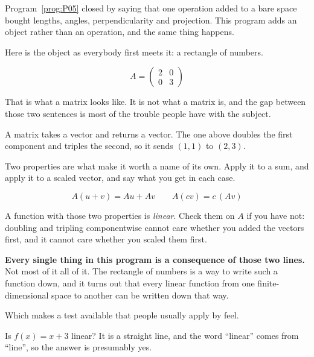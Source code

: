 \begin{fr}
Program~\ref{prog:P05} closed by saying that one operation added to a bare
space bought lengths, angles, perpendicularity and projection. This program
adds an object rather than an operation, and the same thing happens.

Here is the object as everybody first meets it: a rectangle of numbers.

\[ A = \begin{pmatrix} 2 & 0 \\ 0 & 3 \end{pmatrix} \]

That is what a matrix looks like. It is not what a matrix is, and the gap
between those two sentences is most of the trouble people have with the
subject.
\end{fr}

\begin{fr}
A matrix takes a vector and returns a vector. The one above doubles the first
component and triples the second, so it sends $(1, 1)$ to $(2, 3)$.

Two properties are what make it worth a name of its own. Apply it to a sum, and
apply it to a scaled vector, and say what you get in each case.
\dotline
\nextframe
\end{fr}

\begin{fr}
\begin{ansblock}
\[ A(u + v) = Au + Av \qquad A(cv) = c\,(Av) \]
\end{ansblock}

A function with those two properties is \emph{linear}. Check them on $A$ if you
have not: doubling and tripling componentwise cannot care whether you added the
vectors first, and it cannot care whether you scaled them first.

\textbf{Every single thing in this program is a consequence of those two
lines.} Not most of it \dash{} all of it. The rectangle of numbers is a way to
write such a function down, and it turns out that every linear function from
one finite-dimensional space to another can be written down that way.
\end{fr}


\begin{fr}
Which makes a test available that people usually apply by feel.

Is $f(x) = x + 3$ linear? It is a straight line, and the word \enquote{linear}
comes from \enquote{line}, so the answer is presumably yes.
\nextframe
\end{fr}

